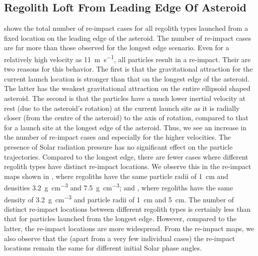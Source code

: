\subsection{Regolith Loft From Leading Edge Of Asteroid}
\label{sec:general_char_leadingEdge}
 shows the total number of re-impact cases for all regolith types launched from a fixed location on the leading edge of the asteroid. The number of re-impact cases are far more than those observed for the longest edge scenario. Even for a relatively high velocity as \SI{11}{\metre\per\second}, all particles result in a re-impact. Their are two reasons for this behavior. The first is that the gravitational attraction for the current launch location is stronger than that on the longest edge of the asteroid. The latter has the weakest gravitational attraction on the entire ellipsoid shaped asteroid. The second is that the particles have a much lower inertial velocity at rest (due to the asteroid's rotation) at the current launch site as it is radially closer (from the centre of the asteroid) to the axis of rotation, compared to that for a launch site at the longest edge of the asteroid. Thus, we see an increase in the number of re-impact cases and especially for the higher velocities.
%
\newline\newline
%
The presence of Solar radiation pressure has no significant effect on the particle trajectories. Compared to the longest edge, there are fewer cases where different regolith types have distinct re-impact locations. We observe this in the re-impact maps shown in , where regoliths have the same particle radii of \SI{1}{\centi\metre} and densities \SI{3.2}{\gram\per\centi\metre\cubed} and \SI{7.5}{\gram\per\centi\metre\cubed}; and , where regoliths have the same density of \SI{3.2}{\gram\per\centi\metre\cubed} and particle radii of \SI{1}{\centi\metre} and \SI{5}{\centi\metre}. The number of distinct re-impact locations between different regolith types is certainly less than that for particles launched from the longest edge. However, compared to the latter, the re-impact locations are more widespread. From the re-impact maps, we also observe that the (apart from a very few individual cases) the re-impact locations remain the same for different initial Solar phase angles.
%
\newline\newline
%
